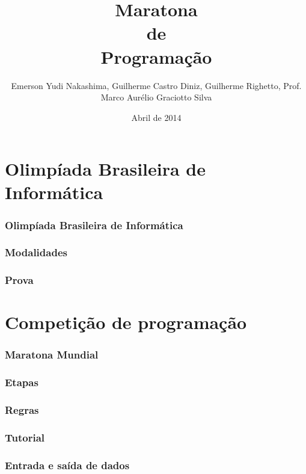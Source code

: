\documentclass[utf8, usepdftitle=false, svgnames, color={table,
fixpdftex, hyperref, fixinclude, xcdraw}, t, brazil]{beamer}
\title{Maratona\\de\\Programação}
\author[UTFPR-CM]{Emerson Yudi Nakashima, Guilherme Castro Diniz, Guilherme Righetto, Prof. Marco Aurélio Graciotto Silva}
\date[]{Abril de 2014}
\begin{document}
 \frontmatter{}
 

 \part{Olimpíada Brasileira de Informática}
 
 \section{Olimpíada Brasileira de Informática}
 
 
 \section{Modalidades}
 
 
 \section{Prova}
 
 
 \part{Competição de programação}
 
 \section{Maratona Mundial}
 
 
 \section{Etapas}
 
 
 \section{Regras}
 
 
 \section{Tutorial}
 

 \section{Entrada e saída de dados}
 
 
\end{document}
